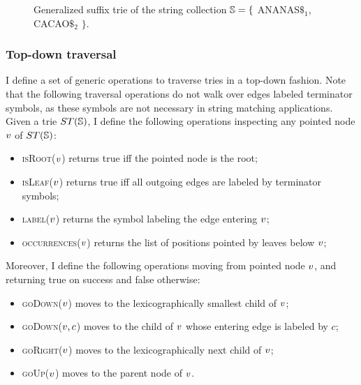 \begin{figure}[t]
\caption[Example of generalized suffix trie]{Generalized suffix trie of the string collection $\mathbb{S} = \{$ {\ttfamily ANANAS$\$_1$}, {\ttfamily CACAO$\$_2$} $\}$.}
\label{fig:gstrie}
\begin{center}

\end{center}
\end{figure}

\subsubsection{Top-down traversal}

I define a set of generic operations to traverse tries in a top-down fashion.
Note that the following traversal operations do not walk over edges labeled terminator symbols, as these symbols are not necessary in string matching applications.
Given a trie $ST(\mathbb{S})$, I define the following operations inspecting any pointed node $v$ of $ST(\mathbb{S})$:
\begin{itemize}
\item \textsc{isRoot}($v$) returns true iff the pointed node is the root;
\item \textsc{isLeaf}($v$) returns true iff all outgoing edges are labeled by terminator symbols;
\item \textsc{label}($v$) returns the symbol labeling the edge entering $v$;
\item \textsc{occurrences}($v$) returns the list of positions pointed by leaves below $v$;
\end{itemize}
Moreover, I define the following operations moving from pointed node $v$, and returning true on success and false otherwise:
\begin{itemize}
\item \textsc{goDown}($v$) moves to the lexicographically smallest child of $v$;
\item \textsc{goDown}($v, c$) moves to the child of $v$ whose entering edge is labeled by $c$;
\item \textsc{goRight}($v$) moves to the lexicographically next child of $v$;
\item \textsc{goUp}($v$) moves to the parent node of $v$.
\end{itemize}

